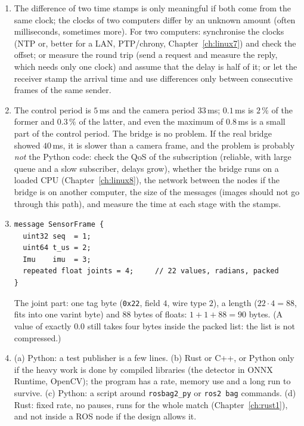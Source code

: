 \begin{enumerate}[label=\textbf{\ansnum.\arabic*}]
  \item The difference of two time stamps is only meaningful if both come from the same clock; the clocks of two computers differ by an unknown amount (often milliseconds, sometimes more). For two computers: synchronise the clocks (NTP or, better for a LAN, PTP/chrony, Chapter~\ref{ch:linux7}) and check the offset; or measure the round trip (send a request and measure the reply, which needs only one clock) and assume that the delay is half of it; or let the receiver stamp the arrival time and use differences only between consecutive frames of the same sender.
  \item The control period is $5$\,ms and the camera period $33$\,ms; $0.1$\,ms is $2\,\%$ of the former and $0.3\,\%$ of the latter, and even the maximum of $0.8$\,ms is a small part of the control period. The bridge is no problem. If the real bridge showed $40$\,ms, it is slower than a camera frame, and the problem is probably \emph{not} the Python code: check the QoS of the subscription (reliable, with large queue and a slow subscriber, delays grow), whether the bridge runs on a loaded CPU (Chapter~\ref{ch:linux8}), the network between the nodes if the bridge is on another computer, the size of the messages (images should not go through this path), and measure the time at each stage with the stamps.
  \item
\begin{verbatim}
message SensorFrame {
  uint32 seq  = 1;
  uint64 t_us = 2;
  Imu    imu  = 3;
  repeated float joints = 4;     // 22 values, radians, packed
}
\end{verbatim}
The joint part: one tag byte (\verb!0x22!, field $4$, wire type $2$), a length ($22\cdot4=88$, fits into one varint byte) and $88$ bytes of floats: $1+1+88=90$ bytes. (A value of exactly $0.0$ still takes four bytes inside the packed list: the list is not compressed.)
  \item (a) Python: a test publisher is a few lines. (b) Rust or C++, or Python only if the heavy work is done by compiled libraries (the detector in ONNX Runtime, OpenCV); the program has a rate, memory use and a long run to survive. (c) Python: a script around \verb!rosbag2_py! or \verb!ros2 bag! commands. (d) Rust: fixed rate, no pauses, runs for the whole match (Chapter~\ref{ch:rust1}), and not inside a ROS node if the design allows it.

\end{enumerate}
